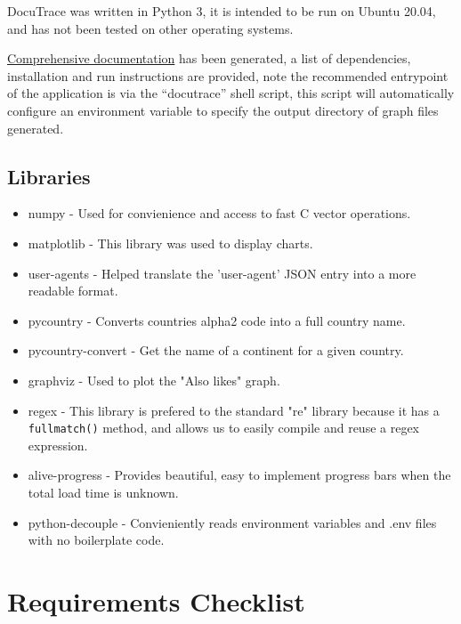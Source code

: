\documentclass[11pt]{article}
\newcommand{\code}[1]{\colorbox{light-gray}{\texttt{#1}}}
\begin{document}
DocuTrace was written in Python 3, it is intended to be run on Ubuntu 20.04, and has not been tested on other operating systems. 

\href{https://www2.macs.hw.ac.uk/~sf52/DocuTrace/html/index.html}{Comprehensive documentation} has been generated, a list of dependencies, installation and run instructions are provided, note the recommended entrypoint of the application is via the ``docutrace'' shell script, this script will automatically configure an environment variable to specify the output directory of graph files generated.

\subsection{Libraries}
\begin{itemize}
    \item numpy - Used for convienience and access to fast C vector operations.
    \item matplotlib - This library was used to display charts.
    \item user-agents - Helped translate the 'user-agent' JSON entry into a more readable format.
    \item pycountry - Converts countries alpha2 code into a full country name.
    \item pycountry-convert - Get the name of a continent for a given country.
    \item graphviz - Used to plot the "Also likes" graph.
    \item regex - This library is prefered to the standard "re" library because it has a \code{fullmatch()} method, and allows us to easily compile and reuse a regex expression.
    \item alive-progress - Provides beautiful, easy to implement progress bars when the total load time is unknown.
    \item python-decouple - Convieniently reads environment variables and .env files with no boilerplate code.
\end{itemize}


\section{Requirements Checklist}
\end{document}
